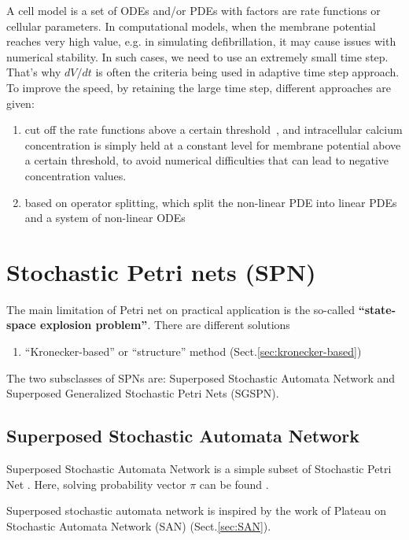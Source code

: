 A cell model is a set of ODEs and/or PDEs with factors are rate
functions or cellular parameters.  In computational models, when the
membrane potential reaches very high value, e.g. in simulating
defibrillation, it may cause issues with numerical stability. In such
cases, we need to use an extremely small time step. That's why $dV/dt$
is often the criteria being used in adaptive time step approach. To
improve the speed, by retaining the large time step, different
approaches are given:
\begin{enumerate}
\item cut off the rate functions above a certain
  threshold~\citep{skouibine2000}, and intracellular calcium
  concentration is simply held at a constant level for membrane
  potential above a certain threshold, to avoid numerical difficulties
  that can lead to negative concentration values.
\item based on operator splitting, which split the non-linear PDE into
  linear PDEs and a system of non-linear ODEs~\citep{hanslien2007}
\end{enumerate}

\section{Stochastic Petri nets (SPN)}
\label{sec:SPN}

The main limitation of Petri net on practical application is the so-called {\bf
``state-space explosion problem''}. There are different solutions
\begin{enumerate}
  \item ``Kronecker-based'' or ``structure'' method (Sect.\ref{sec:kronecker-based})
\end{enumerate}

The two subsclasses of SPNs are: Superposed Stochastic Automata Network and
Superposed Generalized Stochastic Petri Nets (SGSPN).

\subsection{Superposed Stochastic Automata Network}
\label{sec:superposed_SAN}

Superposed Stochastic Automata Network is a simple subset of Stochastic Petri
Net \citep{donatelli1993,donatelli1994}. Here, solving probability vector $\pi$
can be found \citep{buchholz1992, donatelli1993, donatelli1994, buchholz1995}. 

Superposed stochastic automata network is inspired by the work of Plateau on
Stochastic Automata Network (SAN) (Sect.\ref{sec:SAN}). 

